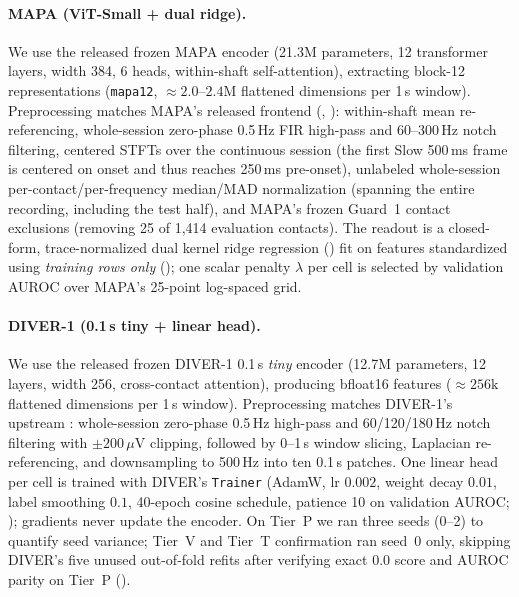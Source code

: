 \documentclass[11pt]{article}
\begin{document}
\paragraph{MAPA (ViT-Small + dual ridge).}
We use the released frozen MAPA encoder (21.3M parameters, 12 transformer layers, width 384, 6 heads, within-shaft self-attention), extracting block-12 representations (\texttt{mapa12}, $\approx 2.0$--$2.4\text{M}$ flattened dimensions per 1\,s window). Preprocessing matches MAPA's released frontend (, ): within-shaft mean re-referencing, whole-session zero-phase 0.5\,Hz FIR high-pass and 60--300\,Hz notch filtering, centered STFTs over the continuous session (the first Slow 500\,ms frame is centered on onset and thus reaches 250\,ms pre-onset), unlabeled whole-session per-contact/per-frequency median/MAD normalization (spanning the entire recording, including the test half), and MAPA's frozen Guard~1 contact exclusions (removing 25 of 1,414 evaluation contacts). The readout is a closed-form, trace-normalized dual kernel ridge regression () fit on features standardized using \emph{training rows only} (); one scalar penalty $\lambda$ per cell is selected by validation AUROC over MAPA's 25-point log-spaced grid.

\paragraph{DIVER-1 (0.1\,s tiny + linear head).}
We use the released frozen DIVER-1 0.1\,s \emph{tiny} encoder (12.7M parameters, 12 layers, width 256, cross-contact attention), producing bfloat16 features ($\approx 256\text{k}$ flattened dimensions per 1\,s window). Preprocessing matches DIVER-1's upstream : whole-session zero-phase 0.5\,Hz high-pass and 60/120/180\,Hz notch filtering with $\pm 200\,\mu\text{V}$ clipping, followed by 0--1\,s window slicing, Laplacian re-referencing, and downsampling to 500\,Hz into ten 0.1\,s patches. One linear head per cell is trained with DIVER's \texttt{Trainer} (AdamW, lr $0.002$, weight decay $0.01$, label smoothing $0.1$, 40-epoch cosine schedule, patience 10 on validation AUROC; ); gradients never update the encoder. On Tier~P we ran three seeds (0--2) to quantify seed variance; Tier~V and Tier~T confirmation ran seed~0 only, skipping DIVER's five unused out-of-fold refits after verifying exact $0.0$ score and AUROC parity on Tier~P ().
\end{document}

